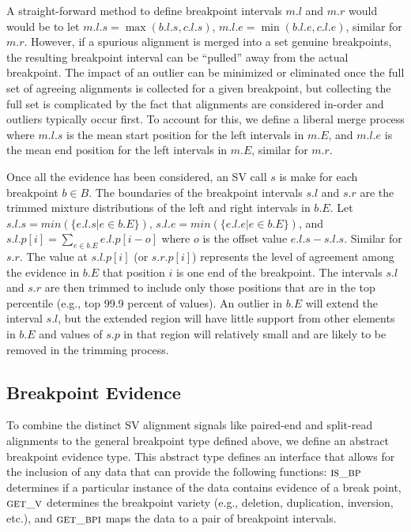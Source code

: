 \documentclass[10pt]{bmc_article}
\newenvironment{bmcformat}{\begin{raggedright}\baselineskip20pt\sloppy\setboolean{publ}{false}}{\end{raggedright}\baselineskip20pt\sloppy}
\begin{document}
\begin{bmcformat}
A straight-forward method to define breakpoint intervals $m.l$ and $m.r$ would
would be to let $m.l.s = \max(b.l.s, c.l.s)$, $m.l.e = \min(b.l.e, c.l.e)$,
similar for $m.r$.  However, if a spurious alignment is merged into a set
genuine breakpoints, the resulting breakpoint interval can be ``pulled'' away
from the actual breakpoint.  The impact of an outlier can be minimized or
eliminated once the full set of agreeing alignments is collected for a given
breakpoint, but collecting the full set is complicated by the fact that
alignments are considered in-order and outliers typically occur first.  To
account for this, we define a liberal merge process where $m.l.s$ is the mean
start position for the left intervals in $m.E$, and  $m.l.e$ is the mean
end position for the left intervals in $m.E$, similar for $m.r$.

Once all the evidence has been considered, an SV call $s$ is make for each
breakpoint $b\in B$.  The boundaries of the breakpoint intervals $s.l$ and $s.r$
are the trimmed mixture distributions of the left and right intervals in $b.E$.
Let $s.l.s=min( \{e.l.s | e\in b.E\})$, $s.l.e=min( \{e.l.e | e\in b.E\})$, and
$s.l.p[i] = \sum_{e \in b.E} e.l.p[i-o]$ where $o$ is the offset value
$e.l.s-s.l.s$.  Similar for $s.r$.  The value at $s.l.p[i]$ (or $s.r.p[i]$)
represents the level of agreement among the evidence in $b.E$ that position $i$
is one end of the breakpoint.  The intervals $s.l$ and $s.r$ are then trimmed to
include only those positions that are in the top percentile (e.g., top 99.9
percent of values).  An outlier in $b.E$ will extend the interval $s.l$, but the
extended region will have little support from other elements in $b.E$ and values
of $s.p$ in that region will relatively small and are likely to be removed in
the trimming process. 

\subsection*{Breakpoint Evidence}

To combine the distinct SV alignment signals like paired-end and split-read
alignments to the general breakpoint type defined above, we define an
abstract breakpoint evidence type.  This abstract type defines an interface that
allows for the inclusion of any data that can provide the following functions:
$\textsc{is\_bp}$ determines if a particular instance of the data contains
evidence of a break point, $\textsc{get\_v}$ determines the breakpoint variety
(e.g., deletion, duplication, inversion, etc.), and $\textsc{get\_bpi}$
maps the data to a pair of breakpoint intervals.


\end{bmcformat}
\end{document}

